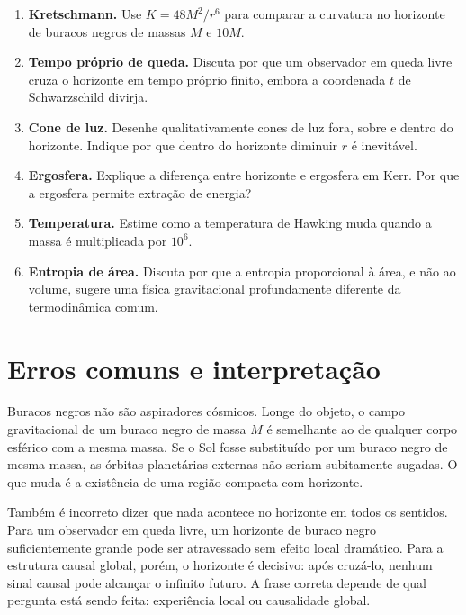 \documentclass[12pt,a4paper,oneside]{book}
\theoremstyle{rgplain}
\theoremstyle{rgremark}
\begin{document}
\begin{enumerate}
  \item \textbf{Kretschmann.} Use
  $K=48M^2/r^6$ para comparar a curvatura no horizonte de buracos negros de
  massas $M$ e $10M$.

  \item \textbf{Tempo próprio de queda.} Discuta por que um observador em queda
  livre cruza o horizonte em tempo próprio finito, embora a coordenada $t$ de
  Schwarzschild divirja.

  \item \textbf{Cone de luz.} Desenhe qualitativamente cones de luz fora,
  sobre e dentro do horizonte. Indique por que dentro do horizonte diminuir
  $r$ é inevitável.

  \item \textbf{Ergosfera.} Explique a diferença entre horizonte e ergosfera em
  Kerr. Por que a ergosfera permite extração de energia?

  \item \textbf{Temperatura.} Estime como a temperatura de Hawking muda quando
  a massa é multiplicada por $10^6$.

  \item \textbf{Entropia de área.} Discuta por que a entropia proporcional à
  área, e não ao volume, sugere uma física gravitacional profundamente
  diferente da termodinâmica comum.
\end{enumerate}

\section{Erros comuns e interpretação}

Buracos negros não são aspiradores cósmicos. Longe do objeto, o campo
gravitacional de um buraco negro de massa $M$ é semelhante ao de qualquer corpo
esférico com a mesma massa. Se o Sol fosse substituído por um buraco negro de
mesma massa, as órbitas planetárias externas não seriam subitamente sugadas. O
que muda é a existência de uma região compacta com horizonte.

Também é incorreto dizer que nada acontece no horizonte em todos os sentidos.
Para um observador em queda livre, um horizonte de buraco negro suficientemente
grande pode ser atravessado sem efeito local dramático. Para a estrutura causal
global, porém, o horizonte é decisivo: após cruzá-lo, nenhum sinal causal pode
alcançar o infinito futuro. A frase correta depende de qual pergunta está sendo
feita: experiência local ou causalidade global.
\end{document}
